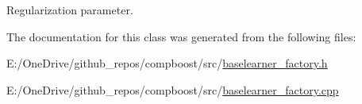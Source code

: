 Regularization parameter. 



The documentation for this class was generated from the following files\+:\begin{DoxyCompactItemize}
\item 
E\+:/\+One\+Drive/github\+\_\+repos/compboost/src/\mbox{\hyperlink{baselearner__factory_8h}{baselearner\+\_\+factory.\+h}}\item 
E\+:/\+One\+Drive/github\+\_\+repos/compboost/src/\mbox{\hyperlink{baselearner__factory_8cpp}{baselearner\+\_\+factory.\+cpp}}\end{DoxyCompactItemize}
